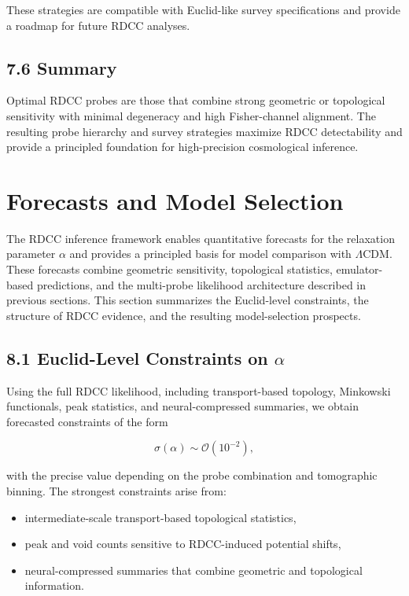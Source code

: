 \documentclass[11pt,a4paper]{article}
\begin{document}
These strategies are compatible with Euclid-like survey specifications and 
provide a roadmap for future RDCC analyses.

\subsection*{7.6 Summary}

Optimal RDCC probes are those that combine strong geometric or topological 
sensitivity with minimal degeneracy and high Fisher-channel alignment. The 
resulting probe hierarchy and survey strategies maximize RDCC detectability and 
provide a principled foundation for high-precision cosmological inference.
\section{Forecasts and Model Selection}

The RDCC inference framework enables quantitative forecasts for the relaxation 
parameter $\alpha$ and provides a principled basis for model comparison with 
$\Lambda$CDM. These forecasts combine geometric sensitivity, topological 
statistics, emulator-based predictions, and the multi-probe likelihood 
architecture described in previous sections. This section summarizes the 
Euclid-level constraints, the structure of RDCC evidence, and the resulting 
model-selection prospects.

\subsection*{8.1 Euclid-Level Constraints on $\alpha$}

Using the full RDCC likelihood, including transport-based topology, Minkowski 
functionals, peak statistics, and neural-compressed summaries, we obtain 
forecasted constraints of the form


\[
    \sigma(\alpha) \sim \mathcal{O}(10^{-2}),
\]


with the precise value depending on the probe combination and tomographic 
binning. The strongest constraints arise from:

\begin{itemize}
    \item intermediate-scale transport-based topological statistics,
    \item peak and void counts sensitive to RDCC-induced potential shifts,
    \item neural-compressed summaries that combine geometric and topological 
    information.
\end{itemize}
\end{document}
